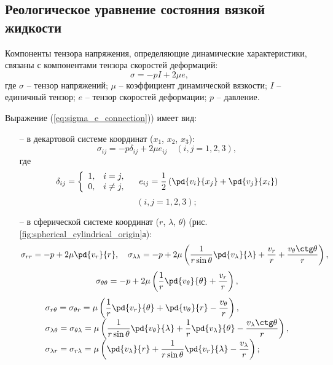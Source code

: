 \documentclass[a4paper, 14pt]{extarticle}
\begin{document}
\subsection{Реологическое уравнение состояния вязкой жидкости}

Компоненты тензора напряжения, определяющие динамические характеристики, связаны с компонентами тензора скоростей деформаций:
\begin{equation}
\label{eq:sigma_e_connection}
\sigma = -p I + 2 \mu e,
\end{equation}
где $\sigma$ -- тензор напряжений; $\mu$ -- коэффициент динамической вязкости; $I$ --  единичный тензор; $e$ -- тензор скоростей деформации;  $p$ -- давление.

Выражение (\ref{eq:sigma_e_connection})) имеет вид:
\begin{itemize}
	\item[--] в декартовой системе координат ($x_1$, $x_2$, $x_3$):
		\[
			\sigma_{ij} = -p\delta_{ij} + 2 \mu e_{ij}\quad (i,j = 1,2,3),	
		\]
		где
		\[
			\delta_{ij} = 
			\left\{
			\begin{array}{cl}
				1, & i = j,\\
				0, & i \neq j,\\
			\end{array}
			\right.\quad
			e_{ij} = \frac{1}{2}\left(
			\pd{v_i}{x_j}+\pd{v_j}{x_i}
			\right)
		\]
		\[
			(i,j = 1,2,3);
		\]
		
	\item[--] в сферической системе координат ($r$, $\lambda$, $\theta$) (рис. \ref{fig:spherical_cylindrical_origin}а):
	\[
	\sigma_{rr} = -p +2\mu\pd{v_r}{r},\quad 
	\sigma_{\lambda\lambda} = -p + 2\mu 
	\left(
		\frac{1}{r\sin\theta} \pd{v_\lambda}{\lambda} + \frac{v_r}{r} + \frac{v_\theta \ctg\theta}{r}
	\right),
	\]
	\[
	\sigma_{\theta\theta} = -p + 2\mu \left(
	\frac{1}{r} \pd{v_\theta}{\theta} + \frac{v_r}{r}
	\right),
	\]
	\[
	\begin{array}{l}
	\sigma_{r\theta} = \sigma_{\theta r} = \displaystyle \mu\left(
	\frac{1}{r} \pd{v_r}{\theta} + \pd{v_\theta}{r} - \frac{v_\theta}{r}
	\right), \\
	\sigma_{\lambda\theta} =  \sigma_{\theta\lambda}= \displaystyle \mu \left(
	\frac{1}{r\sin\theta} \pd{v_\theta}{\lambda} + \frac{1}{r}\pd{v_\lambda}{\theta} - \frac{v_\lambda \ctg\theta}{r}
	\right),\\
	\sigma_{\lambda r} =  \sigma_{r\lambda}= \displaystyle \mu \left(
	 \pd{v_\lambda}{r} + \frac{1}{r\sin\theta}\pd{v_r}{\lambda} - \frac{v_\lambda}{r}
	\right);
	\end{array}
	\]
	

\end{itemize}
\end{document}
